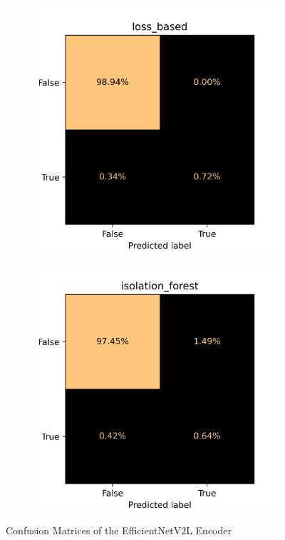 \begin{figure}[H]
    \centering
    \begin{subfigure}{0.4\textwidth}
        \centering
        \includegraphics[width=\textwidth]{./results/efficientnetv2l_vgg19/20230525_194238_loss_based_cm.png}
    \end{subfigure}
    \begin{subfigure}{0.4\textwidth}
        \centering
        \includegraphics[width=\textwidth]{./results/efficientnetv2l_vgg19/20230525_194238_isolation_forest_cm.png}
    \end{subfigure}
    \caption{Confusion Matrices of the EfficientNetV2L Encoder}
    \label{fig:efficientnetv2l_cm}
\end{figure}